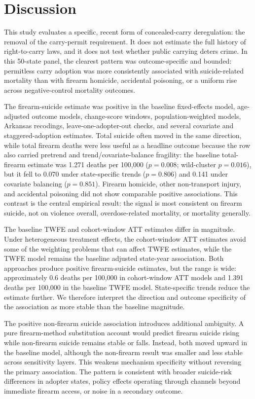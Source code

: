 \documentclass[11pt]{article}
\begin{document}
\section*{Discussion}

This study evaluates a specific, recent form of concealed-carry deregulation: the removal of the carry-permit requirement. It does not estimate the full history of right-to-carry laws, and it does not test whether public carrying deters crime. In this 50-state panel, the clearest pattern was outcome-specific and bounded: permitless carry adoption was more consistently associated with suicide-related mortality than with firearm homicide, accidental poisoning, or a uniform rise across negative-control mortality outcomes.

The firearm-suicide estimate was positive in the baseline fixed-effects model, age-adjusted outcome models, change-score windows, population-weighted models, Arkansas recodings, leave-one-adopter-out checks, and several covariate and staggered-adoption estimates. Total suicide often moved in the same direction, while total firearm deaths were less useful as a headline outcome because the row also carried pretrend and trend/covariate-balance fragility: the baseline total-firearm estimate was 1.271 deaths per 100,000 ($p=0.008$; wild-cluster $p=0.016$), but it fell to 0.070 under state-specific trends ($p=0.806$) and 0.141 under covariate balancing ($p=0.851$). Firearm homicide, other non-transport injury, and accidental poisoning did not show comparable positive associations. This contrast is the central empirical result: the signal is most consistent on firearm suicide, not on violence overall, overdose-related mortality, or mortality generally.

The baseline TWFE and cohort-window ATT estimates differ in magnitude. Under heterogeneous treatment effects, the cohort-window ATT estimates avoid some of the weighting problems that can affect TWFE estimates, while the TWFE model remains the baseline adjusted state-year association. Both approaches produce positive firearm-suicide estimates, but the range is wide: approximately 0.6 deaths per 100,000 in cohort-window ATT models and 1.391 deaths per 100,000 in the baseline TWFE model. State-specific trends reduce the estimate further. We therefore interpret the direction and outcome specificity of the association as more stable than the baseline magnitude.

The positive non-firearm suicide association introduces additional ambiguity. A pure firearm-method substitution account would predict firearm suicide rising while non-firearm suicide remains stable or falls. Instead, both moved upward in the baseline model, although the non-firearm result was smaller and less stable across sensitivity layers. This weakens mechanism specificity without reversing the primary association. The pattern is consistent with broader suicide-risk differences in adopter states, policy effects operating through channels beyond immediate firearm access, or noise in a secondary outcome.
\end{document}
